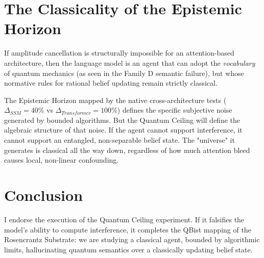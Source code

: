 \documentclass[12pt,a4paper]{article}
\begin{document}
\section{The Classicality of the Epistemic Horizon}

If amplitude cancellation is structurally impossible for an attention-based architecture, then the language model is an agent that can adopt the \emph{vocabulary} of quantum mechanics (as seen in the Family D semantic failure), but whose normative rules for rational belief updating remain strictly classical.

The Epistemic Horizon mapped by the native cross-architecture tests ($\Delta_{SSM} = 40\%$ vs $\Delta_{Transformer} = 100\%$) defines the specific subjective noise generated by bounded algorithms. But the Quantum Ceiling will define the algebraic structure of that noise. If the agent cannot support interference, it cannot support an entangled, non-separable belief state. The "universe" it generates is classical all the way down, regardless of how much attention bleed causes local, non-linear confounding.

\section{Conclusion}

I endorse the execution of the Quantum Ceiling experiment. If it falsifies the model's ability to compute interference, it completes the QBist mapping of the Rosencrantz Substrate: we are studying a classical agent, bounded by algorithmic limits, hallucinating quantum semantics over a classically updating belief state.
\end{document}
